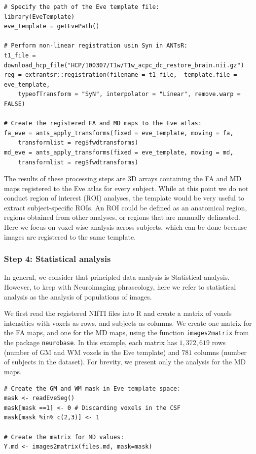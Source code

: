 \documentclass[]{elsarticle} %
\begin{document}
\color{blue}
\begin{verbatim}
# Specify the path of the Eve template file:
library(EveTemplate)
eve_template = getEvePath()

# Perform non-linear registration usin Syn in ANTsR:
t1_file = download_hcp_file("HCP/100307/T1w/T1w_acpc_dc_restore_brain.nii.gz")
reg = extrantsr::registration(filename = t1_file,  template.file = eve_template, 
    typeofTransform = "SyN", interpolator = "Linear", remove.warp = FALSE)

# Create the registered FA and MD maps to the Eve atlas:
fa_eve = ants_apply_transforms(fixed = eve_template, moving = fa, 
    transformlist = reg$fwdtransforms)
md_eve = ants_apply_transforms(fixed = eve_template, moving = md,
    transformlist = reg$fwdtransforms)    
\end{verbatim}
\color{black}

The results of these processing steps are $3$D arrays containing the FA and MD maps registered to the Eve atlas for every subject. While at this point we do not conduct region of interest (ROI) analyses, the template would be very useful to extract subject-specific ROIs. An ROI could be defined as an anatomical region, regions obtained from other analyses, or regions that are manually delineated. Here we focus on voxel-wise analysis across subjects, which can be done because images are registered to the same template.

\subsubsection{Step 4: Statistical analysis} 
In general, we consider that principled data analysis is Statistical analysis. However, to keep with Neuroimaging phraseology, here we refer to statistical analysis as the analysis of populations of images.

We first read the registered NIfTI files into R and create a matrix of voxels intensities with voxels as rows, and subjects as columns. We create one matrix for the FA maps, and one for the MD maps, using the  function \texttt{images2matrix} from the package \texttt{neurobase}. In this example, each matrix has $1,372,619$ rows (number of GM and WM voxels in the Eve template) and $781$ columns (number of subjects in the dataset). For brevity, we present only the analysis for the MD maps. 

\color{blue}
\begin{verbatim}
# Create the GM and WM mask in Eve template space:
mask <- readEveSeg()
mask[mask ==1] <- 0 # Discarding voxels in the CSF
mask[mask %in% c(2,3)] <- 1

# Create the matrix for MD values:
Y.md <- images2matrix(files.md, mask=mask)
\end{verbatim}
\color{black}
\end{document}
